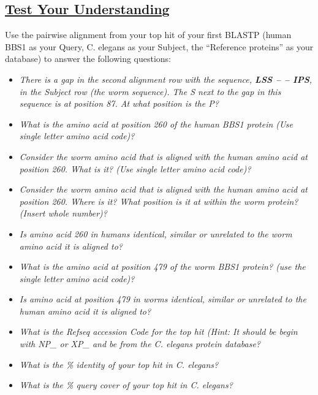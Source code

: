 \documentclass[
]{book}
\providecommand{\tightlist}{%
  \setlength{\itemsep}{0pt}\setlength{\parskip}{0pt}}
\begin{document}
\hypertarget{test-your-understanding-25}{%
\subsection{\texorpdfstring{\href{https://docs.google.com/forms/d/e/1FAIpQLSeACOPQeUC_YCjHqISD95DYyEpiSjJPHThNVxIYZ0v1Okmd2g/viewform?usp=sf_link}{Test Your Understanding}}{Test Your Understanding}}\label{test-your-understanding-25}}

Use the pairwise alignment from your top hit of your first BLASTP (human BBS1 as your Query, C. elegans as your Subject, the ``Reference proteins'' as your database) to answer the following questions:

\begin{itemize}
\tightlist
\item
  \emph{There is a gap in the second alignment row with the sequence, \textbf{LSS -- -- IPS}, in the Subject row (the worm sequence). The S next to the gap in this sequence is at position 87. At what position is the P?}
\item
  \emph{What is the amino acid at position 260 of the human BBS1 protein (Use single letter amino acid code)?}
\item
  \emph{Consider the worm amino acid that is aligned with the human amino acid at position 260. What is it? (Use single letter amino acid code)?}
\item
  \emph{Consider the worm amino acid that is aligned with the human amino acid at position 260. Where is it? What position is it at within the worm protein? (Insert whole number)?}
\item
  \emph{Is amino acid 260 in humans identical, similar or unrelated to the worm amino acid it is aligned to?}
\item
  \emph{What is the amino acid at position 479 of the worm BBS1 protein? (use the single letter amino acid code)?}
\item
  \emph{Is amino acid at position 479 in worms identical, similar or unrelated to the human amino acid it is aligned to?}
\item
  \emph{What is the Refseq accession Code for the top hit (Hint: It should be begin with NP\_ or XP\_ and be from the C. elegans protein database?}
\item
  \emph{What is the \% identity of your top hit in C. elegans?}
\item
  \emph{What is the \% query cover of your top hit in C. elegans?}
\end{itemize}
\end{document}
